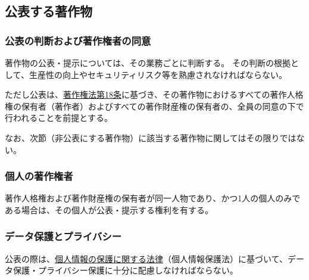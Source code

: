 \subsection{公表する著作物}

\subsubsection{公表の判断および著作権者の同意}
著作物の公表・提示については、その業務ごとに判断する。
その判断の根拠として、生産性の向上やセキュリティリスク等を熟慮されなければならない。

ただし公表は、\href{https://elaws.e-gov.go.jp/document?lawid=345AC0000000048\#Mp-At_2}{著作権法第18条}に基づき、その著作物におけるすべての著作人格権の保有者（著作者）およびすべての著作財産権の保有者の、全員の同意の下で行われることを前提とする。

なお、次節（非公表にする著作物）に該当する著作物に関してはその限りではない。

\subsubsection{個人の著作権者\label{subsec:individualholder}}
著作人格権および著作財産権の保有者が同一人物であり、かつ1人の個人のみである場合は、その個人が公表・提示する権利を有する。

\subsubsection{データ保護とプライバシー}
公表の際は、\href{https://elaws.e-gov.go.jp/document?lawid=415AC0000000057}{個人情報の保護に関する法律}（個人情報保護法）\cite{eGovPersonalInfoProtectionLaw}に基づいて、データ保護・プライバシー保護に十分に配慮しなければならない。


